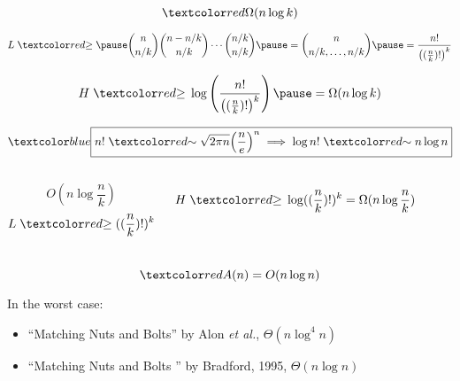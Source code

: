 \begin{frame}{}
  \[
    \red{\Omega(n \log k)}
  \]

  \pause
  \[
	L \;\red{\ge}\; \pause \binom{n}{n/k} \binom{n-n/k}{n/k} \cdots \binom{n/k}{n/k}
	\pause = \binom{n}{n/k, \ldots, n/k} \pause = \frac{n!}{\left( (\frac{n}{k})! \right)^{k}}
  \]

  \pause
  \[
	H \;\red{\ge}\; \log \left(\frac{n!}{\left( (\frac{n}{k})! \right)^{k}} \right) \pause = \Omega(n \log k)
  \]

  \pause
  \vspace{0.30cm}
  \[
	\blue{\boxed{n! \;\red{\sim}\; \sqrt{2 \pi n} \Big(\frac{n}{e}\Big)^{n} \implies \log n! \;\red{\sim}\; n \log n}}
  \]
\end{frame}

\begin{frame}{}
  \begin{center}
	{}
  \end{center}


  \begin{columns}
	  \pause
	  \[
		O(n \log \frac{n}{k})
	  \]
	  \pause
	  \[
		L \;\red{\ge}\; ((\frac{n}{k})!)^k
	  \]

	  \pause
	  \[
		H \;\red{\ge}\; \log ((\frac{n}{k})!)^k = \Omega(n \log \frac{n}{k})
	  \]
  \end{columns}
\end{frame}

\begin{frame}{}
  \centerline{}

  \pause
  \centerline{}

  \pause
  \[
    \red{A(n)} = O(n \log n)
  \]

  \pause
  \begin{alertblock}{In the worst case:}
	{\small
    \begin{itemize}
      \item ``Matching Nuts and Bolts'' by Alon \emph{et al.}, \hfill $\Theta(n \log^4 n)$
	  \item ``Matching Nuts and Bolts '' by Bradford, 1995, \hfill $\Theta(n \log n)$ 
    \end{itemize}
  }
  \end{alertblock}
\end{frame}

